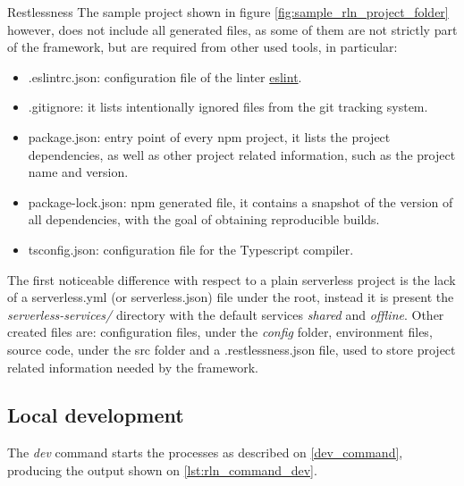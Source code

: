 \begin{chapter}{Restlessness}
    The sample project shown in figure \ref{fig:sample_rln_project_folder} however,
    does not include all generated files, as some of them are not strictly part of
    the framework, but are required from other used tools, in particular:
    \begin{itemize}
        \item .eslintrc.json: configuration file of the linter
            \href{https://eslint.org/}{eslint}.
        \item .gitignore: it lists intentionally ignored files from the git tracking
            system.
        \item package.json: entry point of every npm project, it lists the project
            dependencies, as well as other project related information, such as
            the project name and version.
        \item package-lock.json: npm generated file, it contains a snapshot of the
            version of all dependencies, with the goal of obtaining reproducible
            builds.
        \item tsconfig.json: configuration file for the Typescript compiler.
    \end{itemize}

    The first noticeable difference with respect to a plain serverless project is the
    lack of a serverless.yml (or serverless.json) file under the root, instead it
    is present the \textit{serverless-services/} directory with the default services
    \textit{shared} and \textit{offline}.
    Other created files are: configuration files, under the \textit{config} folder,
    environment files, source code, under the src folder and a .restlessness.json
    file, used to store project related information needed by the framework.

    \subsection{Local development}
    \label{sec:local_dev}

    The \textit{dev} command starts the processes as described on \ref{dev_command},
    producing the output shown on \ref{lst:rln_command_dev}.

    \bigskip


\end{chapter}
